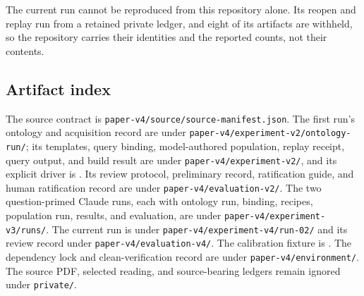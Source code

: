 \documentclass[10pt]{article}
\newcommand{\code}[1]{\texttt{#1}}
\begin{document}
The current run cannot be reproduced from this repository alone. Its reopen and replay run from a retained private ledger, and eight of its artifacts are withheld, so the repository carries their identities and the reported counts, not their contents.

\subsection{Artifact index}

The source contract is \code{paper-v4/source/source-manifest.json}. The first run's ontology and acquisition record are under \code{paper-v4/experiment-v2/ontology-run/}; its templates, query binding, model-authored population, replay receipt, query output, and build result are under \code{paper-v4/experiment-v2/}, and its explicit driver is {\scriptsize{}}. Its review protocol, preliminary record, ratification guide, and human ratification record are under \code{paper-v4/evaluation-v2/}. The two question-primed Claude runs, each with ontology run, binding, recipes, population run, results, and evaluation, are under \code{paper-v4/experiment-v3/runs/}. The current run is under \code{paper-v4/experiment-v4/run-02/} and its review record under \code{paper-v4/evaluation-v4/}. The calibration fixture is {\scriptsize{}}. The dependency lock and clean-verification record are under \code{paper-v4/environment/}. The source PDF, selected reading, and source-bearing ledgers remain ignored under \code{private/}.



\end{document}
